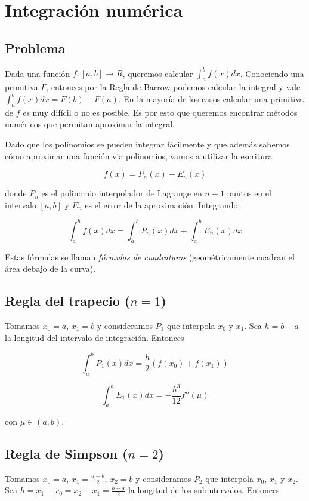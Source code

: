 \section{Integración numérica}

\subsection{Problema}

Dada una función $f : [a, b] \to R$, queremos calcular $\int_{a}^b f(x) dx$. Conociendo una primitiva $F$, entonces por la Regla de Barrow podemos calcular la integral y vale $\int_{a}^b f(x) dx = F(b) - F(a)$. En la mayoría de los casos calcular una primitiva de $f$ es muy difícil o no es posible. Es por esto que queremos encontrar métodos numéricos que permitan aproximar la integral.

Dado que los polinomios se pueden integrar fácilmente y que además sabemos cómo aproximar una función via polinomios, vamos a utilizar la escritura

\[f(x) = P_n(x) + E_n(x)\]

donde $P_n$ es el polinomio interpolador de Lagrange en $n + 1$ puntos en el intervalo $[a, b]$ y $E_n$ es el error de la aproximación. Integrando:

\[\int_{a}^b f(x) dx = \int_{a}^b P_n(x) dx + \int_{a}^b E_n(x) dx\]

Estas fórmulas se llaman \textit{fórmulas de cuadraturas} (geométricamente cuadran el área debajo de la curva).

\subsection{Regla del trapecio ($n = 1$)}

Tomamos $x_0 = a$, $x_1 = b$ y consideramos $P_1$ que interpola $x_0$ y $x_1$. Sea $h = b - a$ la longitud del intervalo de integración. Entonces

\[\int_{a}^b P_1(x) dx = \frac{h}{2}(f(x_0) + f(x_1))\]

\[\int_{a}^b E_1(x) dx = -\frac{h^3}{12} f''(\mu)\]

con $\mu \in (a, b)$.

\subsection{Regla de Simpson ($n = 2$)}

Tomamos $x_0 = a$, $x_1 = \frac{a + b}{2}$, $x_2 = b$ y consideramos $P_2$ que interpola $x_0$, $x_1$ y $x_2$. Sea $h = x_1 - x_0 = x_2 - x_1 = \frac{b - a}{2}$ la longitud de los subintervalos. Entonces


